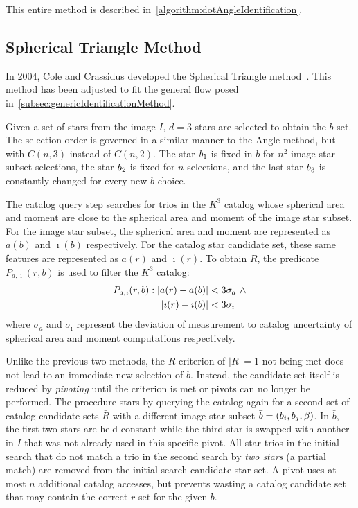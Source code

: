 This entire method is described in~\autoref{algorithm:dotAngleIdentification}.

\subsection{Spherical Triangle Method}\label{subsec:sphericalTriangleMethod}
In 2004, Cole and Crassidus developed the Spherical Triangle method~\cite{Spherical}.
This method has been adjusted to fit the general flow posed in~\autoref{subsec:genericIdentificationMethod}.

Given a set of stars from the image $I$, $d = 3$ stars are selected to obtain the $b$ set.
The selection order is governed in a similar manner to the Angle method, but with $C(n, 3)$ instead of
$C(n, 2)$.
The star $b_1$ is fixed in $b$ for $n^2$ image star subset selections, the star $b_2$ is fixed for
$n$ selections, and the last star $b_3$ is constantly changed for every new $b$ choice.

The catalog query step searches for trios in the $K^3$ catalog whose spherical area and moment
are close to the spherical area and moment of the image star subset.
For the image star subset, the spherical area and moment are represented as $a(b)$ and $\imath(b)$ respectively.
For the catalog star candidate set, these same features are represented as $a(r)$ and $\imath(r)$.
To obtain $R$, the predicate $P_{a, \imath}(r, b)$ is used to filter the $K^3$ catalog:
\begin{equation}
    \begin{aligned}
        P_{a, \imath}(r, b) : \left|  a(r) - a(b) \right| &< 3\sigma_{a}
        \ \land \\ \left| \imath(r) - \imath(b) \right| &< 3\sigma_{\imath}
    \end{aligned}
\end{equation}
where $\sigma_a$ and $\sigma_\imath$ represent the deviation of measurement to catalog uncertainty of spherical area
and moment computations respectively.

Unlike the previous two methods, the $R$ criterion of $|R| = 1$ not being met does not lead to an immediate new
selection of $b$.
Instead, the candidate set itself is reduced by \textit{pivoting} until the criterion is met or pivots can no longer
be performed.
The procedure stars by querying the catalog again for a second set of catalog candidate sets $\bar{R}$ with a
different image star subset $\bar{b} = \left(b_i, b_j, \beta\right)$.
In $\bar{b}$, the first two stars are held constant while the third star is swapped with another in $I$ that was not
already used in this specific pivot.
All star trios in the initial search that do not match a trio in the second search by \textit{two stars} (a partial
match) are removed from the initial search candidate star set.
A pivot uses at most $n$ additional catalog accesses, but prevents wasting a catalog candidate set that may contain the
correct $r$ set for the given $b$.

